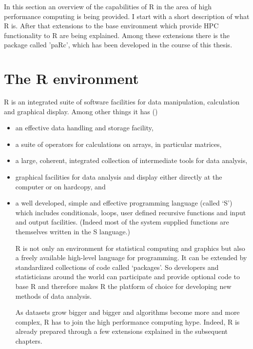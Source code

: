 In this section an overview of the capabilities of R in the area of
high performance computing is being provided. I start with a short
description of what R is. After that extensions to the base
environment which provide HPC functionality to R are being
explained. Among these extensions there is the package called 'paRc',
which has been developed in the course of this thesis.

\section{The R environment}

R is an integrated suite of software facilities for data manipulation,
calculation and graphical display. Among other things it has (\cite{IntrotoR})
\begin{itemize}
\item an effective data handling and storage facility,
\item a suite of operators for calculations on arrays, in particular matrices,
\item a large, coherent, integrated collection of intermediate tools
  for data analysis,
\item graphical facilities for data analysis and display either
  directly at the computer or on hardcopy, and
\item a well developed, simple and effective programming language
  (called `S') which includes conditionals, loops, user defined
  recursive functions and input and output facilities. (Indeed most of
  the system supplied functions are themselves written in the S
  language.)

R is not only an environment for statistical computing and graphics
but also a freely available high-level language for programming. It
can be extended by standardized collections of code called
`packages'. So developers and statisticians around the world can
participate and provide optional code to base R and therefore makes R
the platform of choice for developing new methods of data analysis. 

As datasets grow bigger and bigger and algorithms become more and more
complex, R has to join the high performance computing hype. Indeed, R
is already prepared through a few extensions explained in the
subsequent chapters.



\end{itemize}
